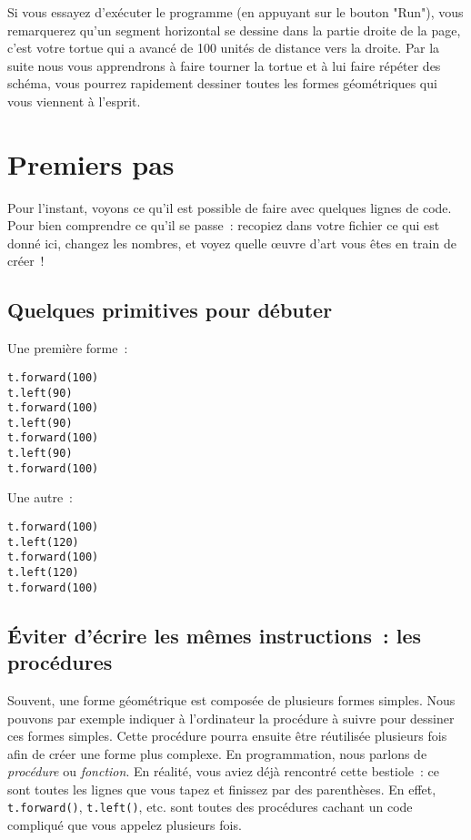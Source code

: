 \documentclass[11pt,a4paper]{article}
\begin{document}
Si vous essayez d'exécuter le programme (en appuyant sur le bouton "Run"),
vous remarquerez qu'un segment horizontal se dessine dans la partie droite de la
page, c'est votre tortue qui a avancé de 100 unités de distance vers la droite.
Par la suite nous vous apprendrons à faire tourner la tortue et à lui faire
répéter des schéma, vous pourrez rapidement dessiner toutes les formes
géométriques qui vous viennent à l'esprit.

\section{Premiers pas}

Pour l'instant, voyons ce qu'il est possible de faire avec quelques lignes de
code. Pour bien comprendre ce qu'il se passe~: recopiez dans votre fichier ce
qui est donné ici, changez les nombres, et voyez quelle œuvre d'art vous êtes en
train de créer~!

\subsection{Quelques primitives pour débuter}
Une première forme~:

\begin{lstlisting}
t.forward(100)
t.left(90)
t.forward(100)
t.left(90)
t.forward(100)
t.left(90)
t.forward(100)
\end{lstlisting}

Une autre~:

\begin{lstlisting}
t.forward(100)
t.left(120)
t.forward(100)
t.left(120)
t.forward(100)
\end{lstlisting}

\subsection{Éviter d'écrire les mêmes instructions~: les procédures}

Souvent, une forme géométrique est composée de plusieurs formes simples. Nous
pouvons par exemple indiquer à l'ordinateur la procédure à suivre pour dessiner
ces formes simples. Cette procédure pourra ensuite être réutilisée plusieurs
fois afin de créer une forme plus complexe. En programmation, nous parlons de
\emph{procédure} ou \emph{fonction}. En réalité, vous aviez déjà rencontré cette
bestiole~: ce sont toutes les lignes que vous tapez et finissez par des
parenthèses. En effet, \lstinline{t.forward()}, \lstinline{t.left()},
etc. sont toutes des procédures cachant un code compliqué que vous appelez
plusieurs fois.
\end{document}
